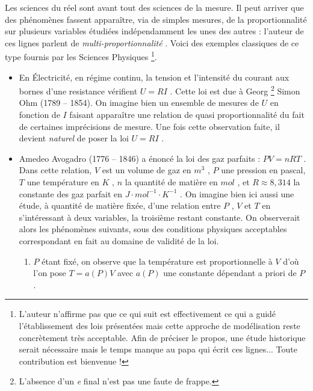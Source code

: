 Les sciences du réel sont avant tout des sciences de la mesure. Il peut arriver que des phénomènes fassent apparaître, via de simples mesures, de la proportionnalité sur plusieurs variables étudiées indépendamment les unes des autres : l'auteur de ces lignes parlent de \emph{\og multi-proportionnalité \fg}. Voici des exemples classiques de ce type fournis par les Sciences Physiques
\footnote{
	L'auteur n'affirme pas que ce qui suit est effectivement ce qui a guidé l'établissement des lois présentées mais cette approche de modélisation reste concrètement très acceptable.
	Afin de préciser le propos, une étude historique serait nécessaire mais le temps manque au papa qui écrit ces lignes...
	Toute contribution est bienvenue !
}.




\begin{itemize}[label=\small\textbullet]
	\item En Électricité, en régime continu, la tension et l'intensité du courant aux bornes d'une resistance vérifient $U = RI$ . Cette loi est due à Georg
	\footnote{
		L'absence d'un \emph{\og e \fg} final n'est pas une faute de frappe.
	}
	Simon Ohm (1789 -- 1854). On imagine bien un ensemble de mesures de $U$ en fonction de $I$ faisant apparaître une relation de quasi proportionnalité du fait de certaines imprécisions de mesure. Une fois cette observation faite, il devient \emph{\og naturel \fg} de poser la loi $U = RI$ . 




	\medskip
	\item Amedeo Avogadro (1776 -- 1846) a énoncé la loi des gaz parfaits : $PV = nRT$ .
	Dans cette relation, $V$ est un volume de gaz en $m^3$ , $P$ une pression en pascal, $T$ une température en $K$ , $n$ la quantité de matière en $mol$ , et $R \approx 8,314$ la constante des gaz parfait en $J \cdot mol^{-1} \cdot K^{-1}$ .
	On imagine bien ici aussi une étude, à quantité de matière fixée, d'une relation entre $P$ , $V$ et $T$ en s'intéressant à deux variables, la troisième restant constante. On observerait alors les phénomènes suivants, sous des conditions physiques acceptables correspondant en fait au domaine de validité de la loi.
	
	\begin{enumerate}[label=(\alph*)]
		\item $P$ étant fixé, on observe que la température est proportionnelle à $V$ d'où l'on pose $T = a(P) V$ avec $a(P)$ une constante dépendant a priori de $P$ .


\end{enumerate}
\end{itemize}
